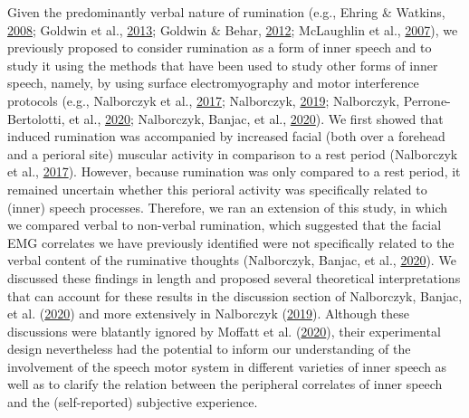 \documentclass[
  english,
  man, donotrepeattitle,floatsintext]{apa6}
\begin{document}
Given the predominantly verbal nature of rumination (e.g., Ehring \& Watkins, \protect\hyperlink{ref-ehring_repetitive_2008}{2008}; Goldwin et al., \protect\hyperlink{ref-goldwin_concreteness_2013}{2013}; Goldwin \& Behar, \protect\hyperlink{ref-goldwin_concreteness_2012}{2012}; McLaughlin et al., \protect\hyperlink{ref-mclaughlin_effects_2007}{2007}), we previously proposed to consider rumination as a form of inner speech and to study it using the methods that have been used to study other forms of inner speech, namely, by using surface electromyography and motor interference protocols (e.g., Nalborczyk et al., \protect\hyperlink{ref-nalborczyk_orofacial_2017}{2017}; Nalborczyk, \protect\hyperlink{ref-nalborczyk_understanding_2019}{2019}; Nalborczyk, Perrone-Bertolotti, et al., \protect\hyperlink{ref-nalborczyk_articulatory_2020}{2020}; Nalborczyk, Banjac, et al., \protect\hyperlink{ref-nalborczyk_dissociating_2020}{2020}). We first showed that induced rumination was accompanied by increased facial (both over a forehead and a perioral site) muscular activity in comparison to a rest period (Nalborczyk et al., \protect\hyperlink{ref-nalborczyk_orofacial_2017}{2017}). However, because rumination was only compared to a rest period, it remained uncertain whether this perioral activity was specifically related to (inner) speech processes. Therefore, we ran an extension of this study, in which we compared verbal to non-verbal rumination, which suggested that the facial EMG correlates we have previously identified were not specifically related to the verbal content of the ruminative thoughts (Nalborczyk, Banjac, et al., \protect\hyperlink{ref-nalborczyk_dissociating_2020}{2020}). We discussed these findings in length and proposed several theoretical interpretations that can account for these results in the discussion section of Nalborczyk, Banjac, et al. (\protect\hyperlink{ref-nalborczyk_dissociating_2020}{2020}) and more extensively in Nalborczyk (\protect\hyperlink{ref-nalborczyk_understanding_2019}{2019}). Although these discussions were blatantly ignored by Moffatt et al. (\protect\hyperlink{ref-moffatt_inner_2020}{2020}), their experimental design nevertheless had the potential to inform our understanding of the involvement of the speech motor system in different varieties of inner speech as well as to clarify the relation between the peripheral correlates of inner speech and the (self-reported) subjective experience.
\end{document}
